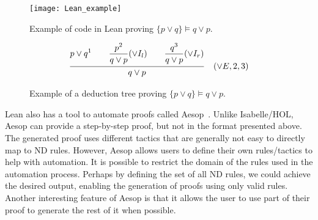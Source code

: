 \begin{figure}[htbp]
    \centering
    \texttt{[image: Lean\_example]}
    \caption{Example of code in Lean proving \(\{p \lor q\} \models q \lor p \).}
    \label{img:lean_example}
\end{figure}

\begin{figure}[h!]
    \centering
        \[
            \frac{ {\displaystyle {p \lor q}^1 
            \quad \quad \displaystyle \frac{\displaystyle p^2}{q \lor p \strut} (\lor I_l) \strut}
            \quad \quad \displaystyle \frac{\displaystyle q^3}{q \lor p \strut} (\lor I_r) \strut}
            {\displaystyle q \lor p \strut} \quad (\vee E, 2, 3)
          \]
          \caption{Example of a deduction tree proving \(\{p \lor q\} \models q \lor p \).}
          \label{tab:lean_example}
      \end{figure}

Lean also has a tool to automate proofs called Aesop~\cite{leanprovercommunity_2021_github}. Unlike Isabelle/HOL, Aesop can provide a step-by-step proof, but not in the format presented above. The generated proof uses different tactics that are generally not easy to directly map to \gls{ND} rules. However, Aesop allows users to define their own rules/tactics to help with automation. It is possible to restrict the domain of the rules used in the automation process. Perhaps by defining the set of all \gls{ND} rules, we could achieve the desired output, enabling the generation of proofs using only valid rules. Another interesting feature of Aesop is that it allows the user to use part of their proof to generate the rest of it when possible.





